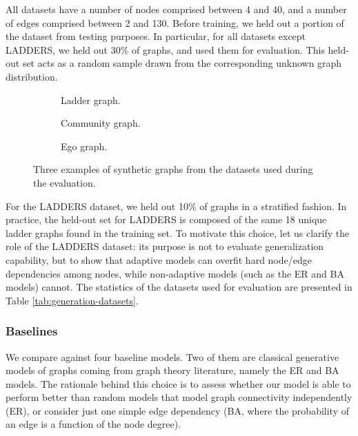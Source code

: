 All datasets have a number of nodes comprised between 4 and 40, and a number of edges comprised between 2 and 130. Before training, we held out a portion of the dataset from testing purposes. In particular, for all datasets except LADDERS, we held out 30\% of graphs, and used them for evaluation. This held-out set acts as a random sample drawn from the corresponding unknown graph distribution.
\begin{figure}[h!]
    \begin{subfigure}[b]{0.25\linewidth}
        \centering
        \resizebox{.55\textwidth}{!}{}
        \caption{Ladder graph.}
        \label{fig:ladder}
    \end{subfigure}
    \begin{subfigure}[b]{0.43\linewidth}
        \centering
        \resizebox{.8\textwidth}{!}{}
        \caption{Community graph.}
        \label{fig:community}
    \end{subfigure}
    \begin{subfigure}[b]{0.30\linewidth}
        \centering
        \resizebox{.8\textwidth}{!}{}
        \caption{Ego graph.}
        \label{fig:ego}
    \end{subfigure}
    \caption{Three examples of synthetic graphs from the datasets used during the evaluation.}
    \label{fig:synthetic-graphs}
\end{figure}
For the LADDERS dataset, we held out 10\% of graphs in a stratified fashion. In practice, the held-out set for LADDERS is composed of the same 18 unique ladder graphs found in the training set. To motivate this choice, let us clarify the role of the LADDERS dataset: its purpose is not to evaluate generalization capability, but to show that adaptive models can overfit hard node/edge dependencies among nodes, while non-adaptive models (such as the ER and BA models) cannot. The statistics of the datasets used for evaluation are presented in Table \ref{tab:generation-datasets}.



\subsubsection*{Baselines}
We compare against four baseline models. Two of them are classical generative models of graphs coming from graph theory literature, namely the ER and BA models. The rationale behind this choice is to assess whether our model is able to perform better than random models that model graph connectivity independently (ER), or consider just one simple edge dependency (BA, where the probability of an edge is a function of the node degree).

